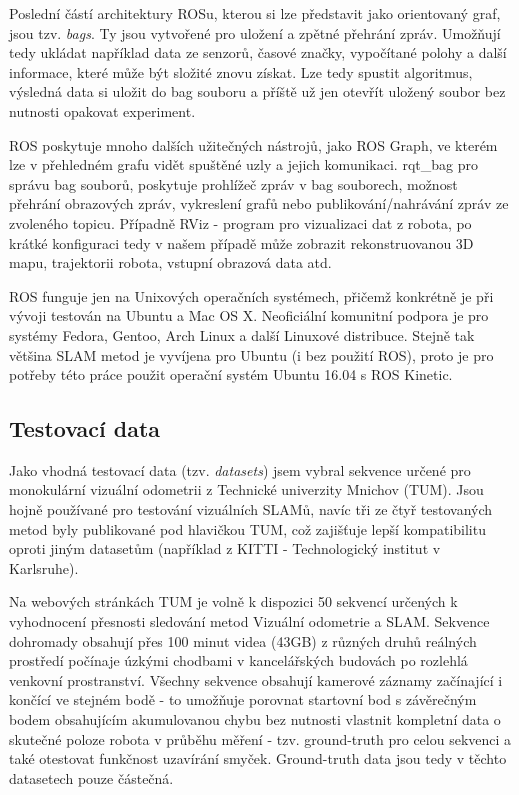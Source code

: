 \documentclass[12pt,a4paper]{article}
\begin{document}
Poslední částí architektury ROSu, kterou si lze představit jako orientovaný graf, jsou tzv. \textit{bags}. Ty jsou vytvořené pro uložení a zpětné přehrání zpráv. Umožňují tedy ukládat například data ze senzorů, časové značky, vypočítané polohy a další informace, které může být složité znovu získat. Lze tedy spustit algoritmus, výsledná data si uložit do bag souboru a příště už jen otevřít uložený soubor bez nutnosti opakovat experiment.

ROS poskytuje mnoho dalších užitečných nástrojů, jako ROS Graph, ve kterém lze v přehledném grafu vidět spuštěné uzly a jejich komunikaci. rqt\_bag pro správu bag souborů, poskytuje prohlížeč zpráv v bag souborech, možnost přehrání obrazových zpráv, vykreslení grafů nebo publikování/nahrávání zpráv ze zvoleného topicu. Případně RViz - program pro vizualizaci dat z robota, po krátké konfiguraci tedy v našem případě může zobrazit rekonstruovanou 3D mapu, trajektorii robota, vstupní obrazová data atd.

ROS funguje jen na Unixových operačních systémech, přičemž konkrétně je při vývoji testován na Ubuntu a Mac OS X. Neoficiální komunitní podpora je pro systémy Fedora, Gentoo, Arch Linux a další Linuxové distribuce. Stejně tak většina SLAM metod je vyvíjena pro Ubuntu (i bez použití ROS), proto je pro potřeby této práce použit operační systém Ubuntu 16.04 s ROS Kinetic.


\subsection{Testovací data}
Jako vhodná testovací data (tzv. \textit{datasets}) jsem vybral sekvence určené pro monokulární vizuální odometrii z Technické univerzity Mnichov (TUM). Jsou hojně používané pro testování vizuálních SLAMů, navíc tři ze čtyř testovaných metod byly publikované pod hlavičkou TUM, což zajišťuje lepší kompatibilitu oproti jiným datasetům (například z KITTI - Technologický institut v Karlsruhe). 

Na webových stránkách TUM je volně k dispozici 50 sekvencí určených k vyhodnocení přesnosti sledování metod Vizuální odometrie a SLAM. Sekvence dohromady obsahují přes 100 minut videa (43GB) z různých druhů reálných prostředí počínaje úzkými chodbami v kancelářských budovách po rozlehlá venkovní prostranství. Všechny sekvence obsahují kamerové záznamy začínající i končící ve stejném bodě - to umožňuje porovnat startovní bod s závěrečným bodem obsahujícím akumulovanou chybu bez nutnosti vlastnit kompletní data o skutečné poloze robota v průběhu měření - tzv. ground-truth pro celou sekvenci a také otestovat funkčnost uzavírání smyček. Ground-truth data jsou  tedy v těchto datasetech pouze částečná.
\end{document}
